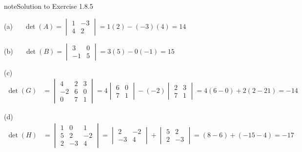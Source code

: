 \documentclass[letterpaper,10pt,english]{jupyterBook}
\begin{document}
\begin{sphinxadmonition}{note}{Solution to Exercise 1.8.5}



\sphinxAtStartPar
(a)   \(\det(A) = \begin{vmatrix} 1 & -3 \\ 4 & 2 \end{vmatrix} = 1(2) - (-3)(4) = 14\)

\sphinxAtStartPar
(b)   \(\det(B) = \begin{vmatrix} 3 & 0 \\ -1 & 5 \end{vmatrix} = 3(5) - 0 (-1) = 15\)

\sphinxAtStartPar
(c)  
\(\begin{align*}
    \det(G) &= 
    \begin{vmatrix}
         4 & 2 & 3 \\
        -2 & 6 & 0 \\
         0 & 7 & 1
    \end{vmatrix}
    = 4
    \begin{vmatrix} 6 & 0 \\ 7 & 1 \end{vmatrix} 
    - (-2)
    \begin{vmatrix} 2 & 3 \\ 7 & 1 \end{vmatrix}
    = 4(6 - 0) + 2(2 - 21) = -14
\end{align*} \)

\sphinxAtStartPar
(d)  
\(\begin{align*}
    \det(H) &=
    \begin{vmatrix}
        1 &  0 &  1 \\
        5 &  2 & -2 \\ 
        2 & -3 &  4
    \end{vmatrix}
    =
    \begin{vmatrix} 2 & -2 \\ -3 &  4 \end{vmatrix} +
    \begin{vmatrix} 5 &  2 \\  2 & -3 \end{vmatrix}
    = (8 - 6) + (-15 - 4) = -17
\end{align*} \)
\end{sphinxadmonition}
 \label{_pages/A1_Matrices_exercises_solutions:_pages/A1_Matrices_exercises_solutions-solution-5}
\end{document}
